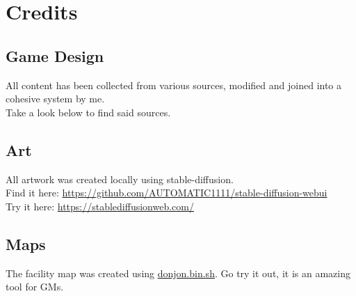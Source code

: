 \chapter{Credits}
\section*{Game Design}
All content has been collected from various sources, modified and joined into a cohesive system by me.\\
Take a look below to find said sources.

\section*{Art}
All artwork was created locally using stable-diffusion.\\
Find it here: \url{https://github.com/AUTOMATIC1111/stable-diffusion-webui}\\
Try it here: \url{https://stablediffusionweb.com/}

\section*{Maps}
The facility map was created using \url{donjon.bin.sh}.
Go try it out, it is an amazing tool for GMs.
